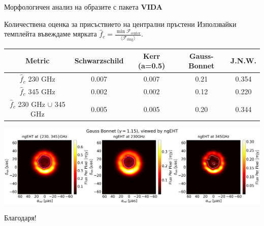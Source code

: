\documentclass[hyperref={colorlinks,citecolor=blue,linkcolor=blue,urlcolor=blue}]{beamer}
\begin{document}
	\begin{frame}{Морфологичен анализ на образите с пакета \textbf{VIDA}}
		\small
		\begin{block}{Количествена оценка за присъствието на централни пръстени}
			Използвайки темплейта въвеждаме мярката $\hat{f}_c = \frac{\min\mathcal{F}_{\text{center}}}{\langle{\mathcal{F}}_{\text{ring}}\rangle}$.
		\end{block}
		\tiny
		\begin{table}
			\centering
			\begin{tabular}{||c|c|c|c|c||}
				\hline
				{Metric} & {Schwarzschild}&{Kerr (a=0.5)}&{Gauss-Bonnet}&{J.N.W.}
				\\\hline
				{{$\hat{f}_c$ 230 GHz}} & 0.007&0.007&0.21&0.354
				\\\hline
				{{$\hat{f}_c$ 345 GHz}} & 0.002&0.002&0.12&0.220
				\\\hline
				{{$\hat{f}_c$ 230 GHz $\cup$ 345 GHz}} & 0.005&0.005&0.20&0.344
				\\\hline
			\end{tabular}
		\end{table}	
		\centering
		\includegraphics[scale = 0.15]{Pre-Defence/Superpos_Compare_GB.png}
	\end{frame}
	
	\begin{frame}
		\centering
		Благодаря!
	\end{frame}
	
\end{document}
